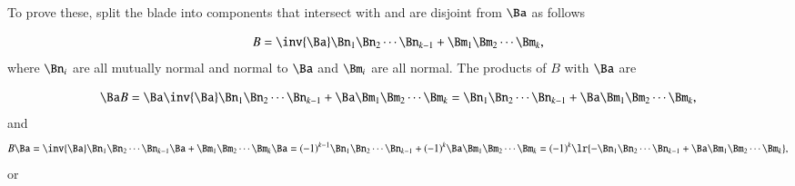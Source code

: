 %
%


To prove these, split the blade into components that intersect with and are disjoint from \( \Ba \) as follows

\begin{dmath}\label{eqn:bladeDotWedgeSymmetryIdentitiesTheorem:240}
B
=
\inv{\Ba} \Bn_1 \Bn_2 \cdots \Bn_{k-1} + \Bm_1 \Bm_2 \cdots \Bm_k,
\end{dmath}
where \( \Bn_i \) are all mutually normal and normal to \( \Ba \) and \( \Bm_i \) are all normal.  The products of \( B \) with \( \Ba \) are

\begin{dmath}\label{eqn:bladeDotWedgeSymmetryIdentitiesTheorem:340}
\Ba B
=
\Ba \inv{\Ba} \Bn_1 \Bn_2 \cdots \Bn_{k-1} + \Ba \Bm_1 \Bm_2 \cdots \Bm_k
=
\Bn_1 \Bn_2 \cdots \Bn_{k-1} + \Ba \Bm_1 \Bm_2 \cdots \Bm_k,
\end{dmath}
and
\begin{dmath}\label{eqn:bladeDotWedgeSymmetryIdentitiesTheorem:360}
B \Ba
=
\inv{\Ba} \Bn_1 \Bn_2 \cdots \Bn_{k-1} \Ba + \Bm_1 \Bm_2 \cdots \Bm_k \Ba
=
(-1)^{k-1} \Bn_1 \Bn_2 \cdots \Bn_{k-1} + (-1)^k \Ba \Bm_1 \Bm_2 \cdots \Bm_k
=
(-1)^k \lr{ - \Bn_1 \Bn_2 \cdots \Bn_{k-1} + \Ba \Bm_1 \Bm_2 \cdots \Bm_k },
\end{dmath}
or

